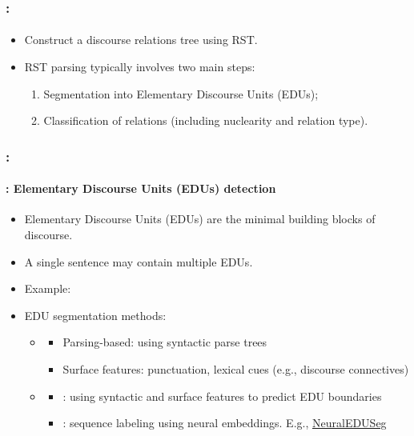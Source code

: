 \documentclass[xcolor=table]{beamer}
\begin{document}
\begin{frame}
	\frametitle{\insertshortsubtitle: \insertsection}
	\framesubtitle{\insertsubsection}
	
	\begin{itemize}
		\item Construct a discourse relations tree using RST.
		\item RST parsing typically involves two main steps:
		\begin{enumerate}
			\item Segmentation into Elementary Discourse Units (EDUs);
			\item Classification of relations (including nuclearity and relation type).
		\end{enumerate}
	\end{itemize}
	
	\begin{center}
	\end{center}
	
\end{frame}

\begin{frame}
	\frametitle{\insertshortsubtitle: \insertsection}
	\framesubtitle{\insertsubsection: Elementary Discourse Units (EDUs) detection}
	
	\begin{itemize}
		\item Elementary Discourse Units (EDUs) are the minimal building blocks of discourse.
		\item A single sentence may contain multiple EDUs.
		\item Example: 
		\item EDU segmentation methods:
		\begin{itemize}
			\item {}
			\begin{itemize}
				\item Parsing-based: using syntactic parse trees
				\item Surface features: punctuation, lexical cues (e.g., discourse connectives)
			\end{itemize}
			\item {}
			\begin{itemize}
				\item {}: using syntactic and surface features to predict EDU boundaries
				\item {}: sequence labeling using neural embeddings. E.g., \href{https://github.com/PKU-TANGENT/NeuralEDUSeg}{NeuralEDUSeg}
			\end{itemize}
		\end{itemize}
	\end{itemize}
	
\end{frame}
\end{document}
